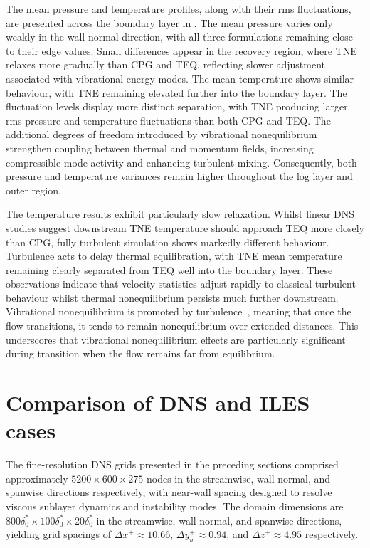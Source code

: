 The mean pressure and temperature profiles, along with their rms fluctuations, are presented across the boundary layer in . The mean pressure varies only weakly in the wall-normal direction, with all three formulations remaining close to their edge values. Small differences appear in the recovery region, where \gls{TNE} relaxes more gradually than \gls{CPG} and \gls{TEQ}, reflecting slower adjustment associated with vibrational energy modes. The mean temperature shows similar behaviour, with \gls{TNE} remaining elevated further into the boundary layer. The fluctuation levels display more distinct separation, with \gls{TNE} producing larger rms pressure and temperature fluctuations than both \gls{CPG} and \gls{TEQ}. The additional degrees of freedom introduced by vibrational nonequilibrium strengthen coupling between thermal and momentum fields, increasing compressible-mode activity and enhancing turbulent mixing. Consequently, both pressure and temperature variances remain higher throughout the log layer and outer region.

The temperature results exhibit particularly slow relaxation. Whilst linear DNS studies suggest downstream \gls{TNE} temperature should approach \gls{TEQ} more closely than \gls{CPG}, fully turbulent simulation shows markedly different behaviour. Turbulence acts to delay thermal equilibration, with \gls{TNE} mean temperature remaining clearly separated from \gls{TEQ} well into the boundary layer. These observations indicate that velocity statistics adjust rapidly to classical turbulent behaviour whilst thermal nonequilibrium persists much further downstream. Vibrational nonequilibrium is promoted by turbulence~\citep{FievetEtAl2019}, meaning that once the flow transitions, it tends to remain nonequilibrium over extended distances. This underscores that vibrational nonequilibrium effects are particularly significant during transition when the flow remains far from equilibrium.


\section{Comparison of DNS and ILES cases}
\label{section:gridstudy}

The fine-resolution \gls{DNS} grids presented in the preceding sections comprised approximately $5200 \times 600 \times 275$ nodes in the streamwise, wall-normal, and spanwise directions respectively, with near-wall spacing designed to resolve viscous sublayer dynamics and instability modes. The domain dimensions are $800\delta^*_0 \times 100\delta^*_0 \times 20\delta^*_0$ in the streamwise, wall-normal, and spanwise directions, yielding grid spacings of $\Delta x^+ \approx 10.66$, $\Delta y^+_w \approx 0.94$, and $\Delta z^+ \approx 4.95$ respectively.

